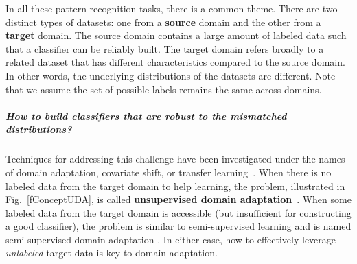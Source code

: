 In all these pattern recognition tasks, there is a common theme. There are  two distinct types of datasets: one from a \textbf{source} domain and the other from a \textbf{target} domain. The source domain contains a large amount of labeled data such that a classifier can be reliably built. The target domain refers broadly to a related dataset that has different characteristics compared to the source domain.  In other words, the underlying distributions of the datasets are different. Note that we assume the set of possible labels remains the same across domains.




\subparagraph{How to build classifiers that are robust to the mismatched distributions?}
Techniques for addressing this challenge have been  investigated under the names of domain adaptation, covariate shift, or  transfer learning~\cite{shimodaira00shift,daume06domain,pan2009survey,gretton09kmm}. When there is no labeled data from the target domain to help learning, the problem, illustrated in Fig.~\ref{fConceptUDA},  is called \textbf{{unsupervised domain adaptation}}~\cite{BlitzerACL07domain,BlitzerEMNLP06Domain,gopalan2011domain,gong12gfk,chen11cotrain}. When some labeled  data from the target domain is accessible (but insufficient for constructing a good classifier), the problem is similar to semi-supervised learning and is named semi-supervised domain adaptation \cite{daume10co,bergamo09weak,saenko2010adapting}. In either case, how to effectively leverage \emph{unlabeled} target data is key to domain adaptation.




